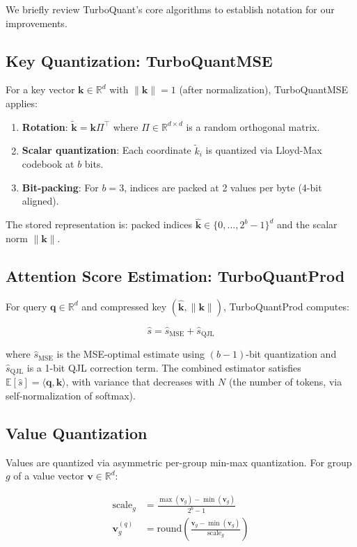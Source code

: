 \documentclass[10pt,twocolumn]{article}
\newcommand{\bm}[1]{\boldsymbol{#1}}
\newcommand{\Eop}{\mathbb{E}}
\newcommand{\R}{\mathbb{R}}
\begin{document}
We briefly review TurboQuant's core algorithms to establish notation for our improvements.

\subsection{Key Quantization: TurboQuantMSE}

For a key vector $\bm{k} \in \R^d$ with $\|\bm{k}\| = 1$ (after normalization), TurboQuantMSE applies:

\begin{enumerate}
\item \textbf{Rotation}: $\tilde{\bm{k}} = \bm{k} \Pi^\top$ where $\Pi \in \R^{d \times d}$ is a random orthogonal matrix.
\item \textbf{Scalar quantization}: Each coordinate $\tilde{k}_i$ is quantized via Lloyd-Max codebook at $b$ bits.
\item \textbf{Bit-packing}: For $b = 3$, indices are packed at 2 values per byte (4-bit aligned).
\end{enumerate}

The stored representation is: packed indices $\hat{\bm{k}} \in \{0, \ldots, 2^b - 1\}^d$ and the scalar norm $\|\bm{k}\|$.

\subsection{Attention Score Estimation: TurboQuantProd}

For query $\bm{q} \in \R^d$ and compressed key $(\hat{\bm{k}}, \|\bm{k}\|)$, TurboQuantProd computes:

$$\hat{s} = \hat{s}_\text{MSE} + \hat{s}_\text{QJL}$$

where $\hat{s}_\text{MSE}$ is the MSE-optimal estimate using $(b-1)$-bit quantization and $\hat{s}_\text{QJL}$ is a 1-bit QJL correction term. The combined estimator satisfies $\Eop[\hat{s}] = \langle \bm{q}, \bm{k} \rangle$, with variance that decreases with $N$ (the number of tokens, via self-normalization of softmax).

\subsection{Value Quantization}
\label{sec:value_overview}

Values are quantized via asymmetric per-group min-max quantization. For group $g$ of a value vector $\bm{v} \in \R^d$:

\begin{align}
\text{scale}_g &= \frac{\max(\bm{v}_g) - \min(\bm{v}_g)}{2^b - 1} \\
\bm{v}_g^{(q)} &= \text{round}\!\left(\frac{\bm{v}_g - \min(\bm{v}_g)}{\text{scale}_g}\right)
\end{align}
\end{document}
